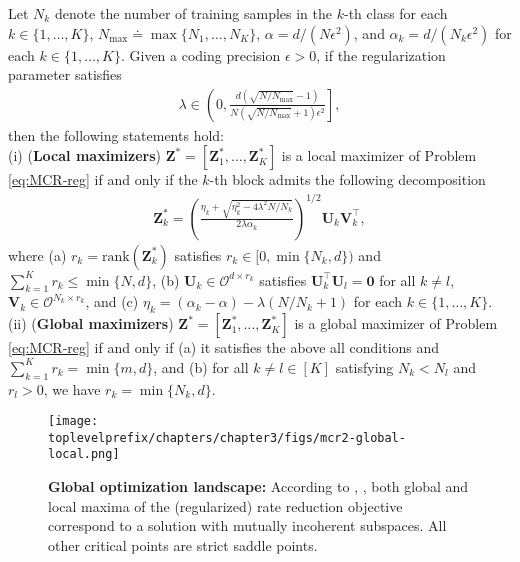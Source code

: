 \documentclass[../../book-main.tex]{subfiles}
\begin{document}
\begin{theorem}\label{thm:mcr-global-opt}
	Let $N_k$ denote the number of training samples in the $k$-th class for each $k \in \{1,\dots,K\}$, $N_{\max} \doteq \max\{N_1,\dots,N_K\}$, $\alpha=d/(N\epsilon^2)$, and $\alpha_{k} = d/(N_k\epsilon^2)$ for each $k \in \{1,\dots,K\}$. Given a coding precision $\epsilon > 0$, if the regularization parameter satisfies
	\begin{align}\label{eq:lambda}
		\lambda \in \left(0, \frac{d(\sqrt{N/N_{\max}}-1)}{N(\sqrt{N/N_{\max}}+1)\epsilon^2} \right],
	\end{align}
	then the following statements hold: \\
	(i) ({\bf Local maximizers}) $\bm Z^* = \left[\bm Z_1^*,\dots,\bm Z_K^* \right]$ is a local maximizer of Problem \eqref{eq:MCR-reg} if and only if the $k$-th block admits the following decomposition
	\begin{align}\label{eq:Zk opti}
		\bm Z_k^* = \left(\frac{ \eta_k + \sqrt{\eta_k^2 - 4\lambda^2N/N_k}}{2\lambda \alpha_{k}}\right)^{1/2} \bm U_k \bm V_k^\top,
	\end{align}
	where (a) $r_k = \mathrm{rank}(\bm Z_k^*)$ satisfies $r_k \in [0,\min\{N_k,d\})$ and $\sum_{k=1}^K r_k \le \min\{N,d\}$, (b) $\bm U_k \in \mathcal{O}^{d \times r_k}$ satisfies $\bm U_k^{\top}\bm U_l = \bm 0$ for all $k \neq l$, $\bm V_k \in \mathcal{O}^{N_k \times r_k}$, and (c) $\eta_k=(\alpha_k-\alpha) - \lambda(N/N_k+1)$ for each $k\in \{1,\dots,K\}$.
	\\
	(ii) ({\bf Global maximizers}) $\bm Z^* = \left[\bm Z_1^*,\dots,\bm Z_K^* \right]$ is a global maximizer of Problem \eqref{eq:MCR-reg} if and only if (a) it satisfies the above all conditions and $\sum_{k=1}^K r_k = \min\{m,d\}$, and (b) for all $k \neq l \in [K]$ satisfying $N_k < N_l$ and $r_l > 0$, we have $r_k = \min\{N_k,d\}$.
\end{theorem}

\begin{figure}[t]
	\centering
	\texttt{[image: \\toplevelprefix/chapters/chapter3/figs/mcr2-global-local.png]}
	\caption{{\bf Global optimization landscape:} According to \cite{sun2015nonconvex,lee2016gradient}, , both global and local maxima of the (regularized) rate reduction objective correspond to a solution with mutually incoherent subspaces. All other critical points are strict saddle points.}
	\label{fig:mcr-global-local}
\end{figure}
\end{document}
